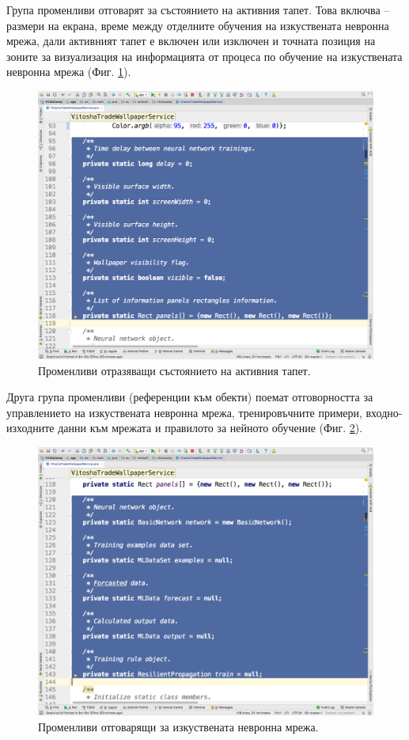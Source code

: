 \documentclass[book,14pt,oneside,openany]{memoir}
\begin{document}
Група променливи отговарят за състоянието на активния тапет. Това включва – размери на екрана, време между отделните обучения на изкуствената невронна мрежа, дали активният тапет е включен или изключен и точната позиция на зоните за визуализация на информацията от процеса по обучение на изкуствената невронна мрежа (Фиг. \ref{fig:pic0033}). 

\begin{figure}[h]
  \centering
  \includegraphics[height=0.45\pdfpageheight]{pic0033}
  \caption{Променливи отразяващи състоянието на активния тапет.}
\label{fig:pic0033}
\end{figure}
\FloatBarrier

Друга група променливи (референции към обекти) поемат отговорността за управлението на изкуствената невронна мрежа, тренировъчните примери, входно-изходните данни към мрежата и правилото за нейното обучение (Фиг. \ref{fig:pic0034}).

\begin{figure}[h]
  \centering
  \includegraphics[height=0.45\pdfpageheight]{pic0034}
  \caption{Променливи отговарящи за изкуствената невронна мрежа.}
\label{fig:pic0034}
\end{figure}
\FloatBarrier
\end{document}
